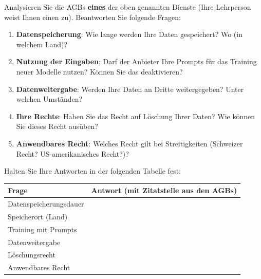 \begin{myexercise}
Analysieren Sie die AGBs \textbf{eines} der oben genannten Dienste
(Ihre Lehrperson weist Ihnen einen zu). Beantworten Sie folgende Fragen:

\begin{enumerate}
    \item \textbf{Datenspeicherung}: Wie lange werden Ihre Daten gespeichert?
          Wo (in welchem Land)?
    \item \textbf{Nutzung der Eingaben}: Darf der Anbieter Ihre Prompts für
          das Training neuer Modelle nutzen? Können Sie das deaktivieren?
    \item \textbf{Datenweitergabe}: Werden Ihre Daten an Dritte weitergegeben?
          Unter welchen Umständen?
    \item \textbf{Ihre Rechte}: Haben Sie das Recht auf Löschung Ihrer Daten?
          Wie können Sie dieses Recht ausüben?
    \item \textbf{Anwendbares Recht}: Welches Recht gilt bei Streitigkeiten
          (Schweizer Recht? US-amerikanisches Recht?)?
\end{enumerate}

Halten Sie Ihre Antworten in der folgenden Tabelle fest:

\begin{center}
\begin{tabular}{p{4cm}p{9cm}}
    \toprule
    \textbf{Frage}               & \textbf{Antwort (mit Zitatstelle aus den AGBs)} \\
    \midrule
    Datenspeicherungsdauer       &                                                  \\[1cm]
    Speicherort (Land)           &                                                  \\[1cm]
    Training mit Prompts         &                                                  \\[1cm]
    Datenweitergabe              &                                                  \\[1cm]
    Löschungsrecht               &                                                  \\[1cm]
    Anwendbares Recht            &                                                  \\[1cm]
    \bottomrule
\end{tabular}
\end{center}
\end{myexercise}

